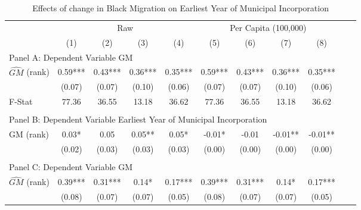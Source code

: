  \begin{table}[htbp]\centering {} \begin{threeparttable} \caption{Effects of change in Black Migration on Earliest Year of Municipal Incorporation} \begin{tabular}{l*{10}{c}} \toprule
                &\multicolumn{4}{c}{Raw}                                    &\multicolumn{4}{c}{Per Capita (100,000)}                   \\\cmidrule(lr){2-5}\cmidrule(lr){6-9}
                &\multicolumn{1}{c}{(1)}   &\multicolumn{1}{c}{(2)}   &\multicolumn{1}{c}{(3)}   &\multicolumn{1}{c}{(4)}   &\multicolumn{1}{c}{(5)}   &\multicolumn{1}{c}{(6)}   &\multicolumn{1}{c}{(7)}   &\multicolumn{1}{c}{(8)}   \\
\cmidrule(lr){1-9}
\multicolumn{8}{l}{Panel A: Dependent Variable GM}\\
\cmidrule(lr){1-9}
$\hat{GM}$ (rank)&       0.59***&       0.43***&       0.36***&       0.35***&       0.59***&       0.43***&       0.36***&       0.35***\\
                &     (0.07)   &     (0.07)   &     (0.10)   &     (0.06)   &     (0.07)   &     (0.07)   &     (0.10)   &     (0.06)   \\
\midrule
F-Stat          &      77.36   &      36.55   &      13.18   &      36.62   &      77.36   &      36.55   &      13.18   &      36.62   \\
\cmidrule[\heavyrulewidth](lr){1-9} \\ \cmidrule[\heavyrulewidth](lr){1-9}
\multicolumn{8}{l}{Panel B: Dependent Variable Earliest Year of Municipal Incorporation}\\
\cmidrule(lr){1-9}
GM  (rank)      &       0.03*  &       0.05   &       0.05** &       0.05*  &      -0.01*  &      -0.01   &      -0.01** &      -0.01** \\
                &     (0.02)   &     (0.03)   &     (0.03)   &     (0.03)   &     (0.00)   &     (0.00)   &     (0.00)   &     (0.00)   \\
\cmidrule[\heavyrulewidth](lr){1-9} \\ \cmidrule[\heavyrulewidth](lr){1-9}
\multicolumn{8}{l}{Panel C: Dependent Variable GM}\\
\cmidrule(lr){1-9}
$\hat{GM}$ (rank)&       0.39***&       0.31***&       0.14*  &       0.17***&       0.39***&       0.31***&       0.14*  &       0.17***\\
                &     (0.08)   &     (0.07)   &     (0.07)   &     (0.05)   &     (0.08)   &     (0.07)   &     (0.07)   &     (0.05)   \\

\end{tabular}
\end{threeparttable}
\end{table}

